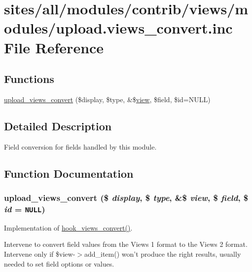 \hypertarget{upload_8views__convert_8inc}{
\section{sites/all/modules/contrib/views/modules/upload.views\_\-convert.inc File Reference}
\label{upload_8views__convert_8inc}
}
\subsection*{Functions}
\begin{CompactItemize}
\item 
\hyperlink{upload_8views__convert_8inc_e2db4470bd480fd4a382e419f0ef55b2}{upload\_\-views\_\-convert} (\$display, \$type, \&\$\hyperlink{classview}{view}, \$field, \$id=NULL)
\end{CompactItemize}


\subsection{Detailed Description}
Field conversion for fields handled by this module. 

\subsection{Function Documentation}
\hypertarget{upload_8views__convert_8inc_e2db4470bd480fd4a382e419f0ef55b2}{
\subsubsection[{upload\_\-views\_\-convert}]{\setlength{\rightskip}{0pt plus 5cm}upload\_\-views\_\-convert (\$ {\em display}, \/  \$ {\em type}, \/  \&\$ {\em view}, \/  \$ {\em field}, \/  \$ {\em id} = {\tt NULL})}}
\label{upload_8views__convert_8inc_e2db4470bd480fd4a382e419f0ef55b2}


Implementation of \hyperlink{group__views__hooks_ge98b0a1c700fe1406af390dfc8c7262e}{hook\_\-views\_\-convert()}.

Intervene to convert field values from the Views 1 format to the Views 2 format. Intervene only if \$view-$>$add\_\-item() won't produce the right results, usually needed to set field options or values. 